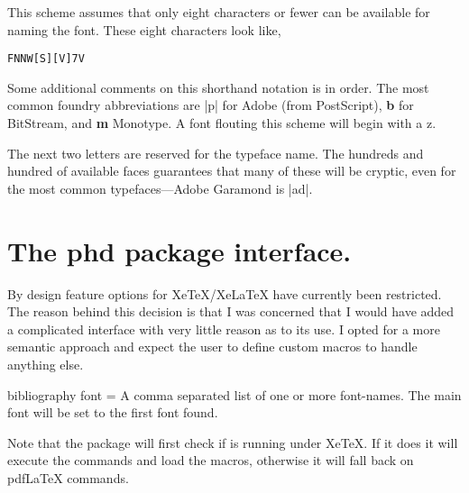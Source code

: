 This scheme assumes that only eight characters or fewer can be available for naming the font. These eight characters look like,

\begin{verbatim}
FNNW[S][V]7V
\end{verbatim}

Some additional comments on this shorthand notation is in order. 
The most common foundry abbreviations are |p| for Adobe (from PostScript), \textbf{b} for BitStream, and \textbf{m} Monotype. A font flouting this scheme will begin with a z.

The next two letters are reserved for the typeface name. The hundreds and hundred of available faces guarantees  that many of these will be cryptic, even for the most common typefaces---Adobe Garamond is |ad|. 





\section{The phd package interface.}

By design feature options for XeTeX/XeLaTeX have currently been restricted. The reason behind this decision is that I was concerned that I would have added a complicated interface with very little reason as to its use. I opted for a more semantic approach and expect the user to define custom macros to handle anything else.
\medskip


\begin{docKey}[phd] {bibliography font}{ = } {}
A comma separated list of one or more font-names. The main font will be set to the first font found.
\end{docKey}

Note that the package will first check if is running under XeTeX. If it does it will execute the commands and load the macros, otherwise it will fall back on pdfLaTeX commands.

